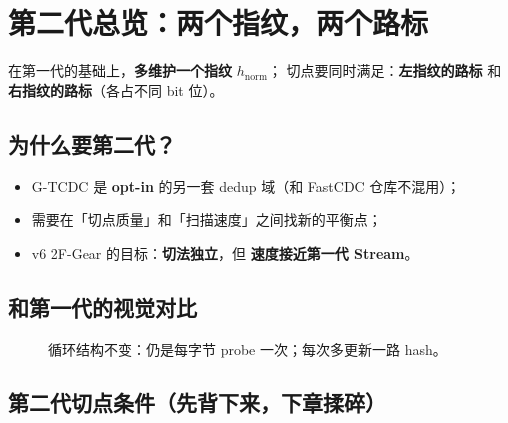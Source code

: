 \chapter{第二代总览：两个指纹，两个路标}
\label{ch:gen2-big}

\begin{gentwobox}
在第一代的基础上，\textbf{多维护一个指纹} $h_{\mathrm{norm}}$；  
切点要同时满足：\textbf{左指纹的路标} 和 \textbf{右指纹的路标}（各占不同 bit 位）。
\end{gentwobox}

\section{为什么要第二代？}

\begin{itemize}[nosep]
  \item G-TCDC 是 \textbf{opt-in} 的另一套 dedup 域（和 FastCDC 仓库不混用）；
  \item 需要在「切点质量」和「扫描速度」之间找新的平衡点；
  \item v6 2F-Gear 的目标：\textbf{切法独立}，但 \textbf{速度接近第一代 Stream}。
\end{itemize}

\section{和第一代的视觉对比}

\begin{figure}[htbp]
\centering
{}
\caption{循环结构不变：仍是每字节 probe 一次；每次多更新一路 hash。}
\end{figure}

\section{第二代切点条件（先背下来，下章揉碎）}

